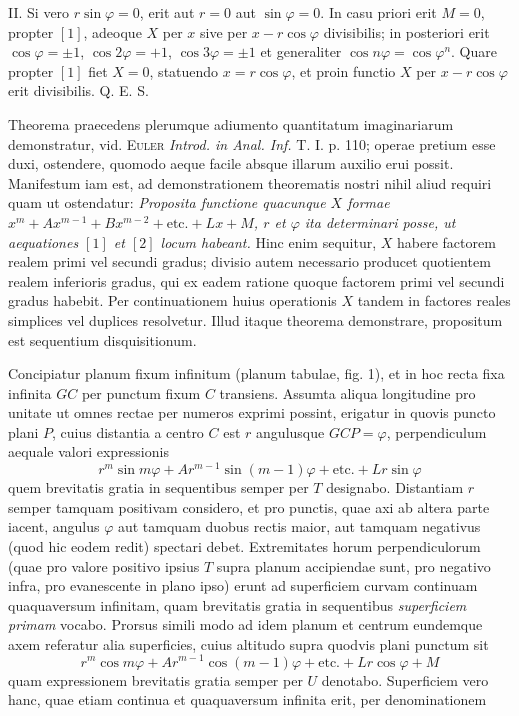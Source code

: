 II. Si vero $r\sin\varphi=0$, erit aut $r=0$ aut $\sin\varphi=0$. In casu priori erit $M=0$, propter $[1]$, adeoque $X$ per $x$ sive per $x-r\cos\varphi$ divisibilis; in posteriori erit $\cos\varphi=\pm1$, $\cos2\varphi=+1$, $\cos3\varphi=\pm1$ et generaliter $\cos n\varphi=\cos\varphi^n$. Quare propter $[1]$ fiet $X=0$, statuendo $x=r\cos\varphi$, et proin functio $X$ per $x-r\cos\varphi$ erit divisibilis. Q. E. S.

Theorema praecedens plerumque adiumento quantitatum imaginariarum demonstratur, vid. \textsc{Euler} \textit{Introd. in Anal. Inf.} T. I. p. 110; operae pretium esse duxi, ostendere, quomodo aeque facile absque illarum auxilio erui possit. Manifestum iam est, ad demonstrationem theorematis nostri nihil aliud requiri quam ut ostendatur: \textit{Proposita functione quacunque $X$ formae $x^m+Ax^{m-1}+Bx^{m-2}+\text{etc.}+Lx+M$, $r$ et $\varphi$ ita determinari posse, ut aequationes $[1]$ et $[2]$ locum habeant.} Hinc enim sequitur, $X$ habere factorem realem primi vel secundi gradus; divisio autem necessario producet quotientem realem inferioris gradus, qui ex eadem ratione quoque factorem primi vel secundi gradus habebit. Per continuationem huius operationis $X$ tandem in factores reales simplices vel duplices resolvetur. Illud itaque theorema demonstrare, propositum est sequentium disquisitionum.

Concipiatur planum fixum infinitum (planum tabulae, fig. 1), et in hoc recta fixa infinita $GC$ per punctum fixum $C$ transiens. Assumta aliqua longitudine pro unitate ut omnes rectae per numeros exprimi possint, erigatur in quovis puncto plani $P$, cuius distantia a centro $C$ est $r$ angulusque $GCP=\varphi$, perpendiculum aequale valori expressionis
\[
r^m\sin m\varphi+Ar^{m-1}\sin(m-1)\varphi+\text{etc.}+Lr\sin\varphi
\]
quem brevitatis gratia in sequentibus semper per $T$ designabo. Distantiam $r$ semper tamquam positivam considero, et pro punctis, quae axi ab altera parte iacent, angulus $\varphi$ aut tamquam duobus rectis maior, aut tamquam negativus (quod hic eodem redit) spectari debet. Extremitates horum perpendiculorum (quae pro valore positivo ipsius $T$ supra planum accipiendae sunt, pro negativo infra, pro evanescente in plano ipso) erunt ad superficiem curvam continuam quaquaversum infinitam, quam brevitatis gratia in sequentibus \textit{superficiem primam} vocabo. Prorsus simili modo ad idem planum et centrum eundemque axem referatur alia superficies, cuius altitudo supra quodvis plani punctum sit
\[
r^m\cos m\varphi+Ar^{m-1}\cos(m-1)\varphi+\text{etc.}+Lr\cos\varphi+M
\]
quam expressionem brevitatis gratia semper per $U$ denotabo. Superficiem vero hanc, quae etiam continua et quaquaversum infinita erit, per denominationem

